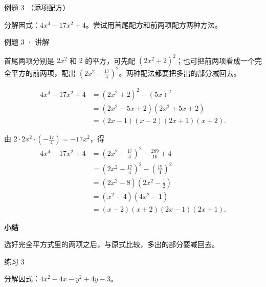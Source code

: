 

\begin{problem}{例题 3 （添项配方）}

分解因式：$4x^4-17x^2+4$。尝试用首尾配方和前两项配方两种方法。

\end{problem}


\begin{solution}{例题 3 · 讲解}

\think 首尾两项分别是 $2x^2$ 和 $2$ 的平方，可先配 $(2x^2+2)^2$；也可把前两项看成一个完全平方的前两项，配出 $\left(2x^2-\frac{17}{4}\right)^2$。两种配法都要把多出的部分减回去。

\begin{align*}
4x^4-17x^2+4&=(2x^2+2)^2-(5x)^2\\
&=(2x^2-5x+2)(2x^2+5x+2)\\
&=(2x-1)(x-2)(2x+1)(x+2).
\end{align*}

由 $2\cdot2x^2\cdot\left(-\frac{17}{4}\right)=-17x^2$，得
\begin{align*}
4x^4-17x^2+4
&=\left(2x^2-\frac{17}{4}\right)^2-\frac{289}{16}+4\\
&=\left(2x^2-\frac{17}{4}\right)^2-\left(\frac{15}{4}\right)^2\\
&=(2x^2-8)\left(2x^2-\frac12\right)\\
&=(x^2-4)(4x^2-1)\\
&=(x-2)(x+2)(2x-1)(2x+1).
\end{align*}


\end{solution}

\ifstudentnotes\else
\begin{tcolorbox}[knotindigo,breakable=false,before skip=6pt plus 2pt,after skip=6pt plus 2pt]
\textbf{小结}\par 选好完全平方式里的两项之后，与原式比较，多出的部分要减回去。
\end{tcolorbox}
\fi

\begin{problem}{练习 3}

分解因式：$4x^2-4x-y^2+4y-3$。

\end{problem}


